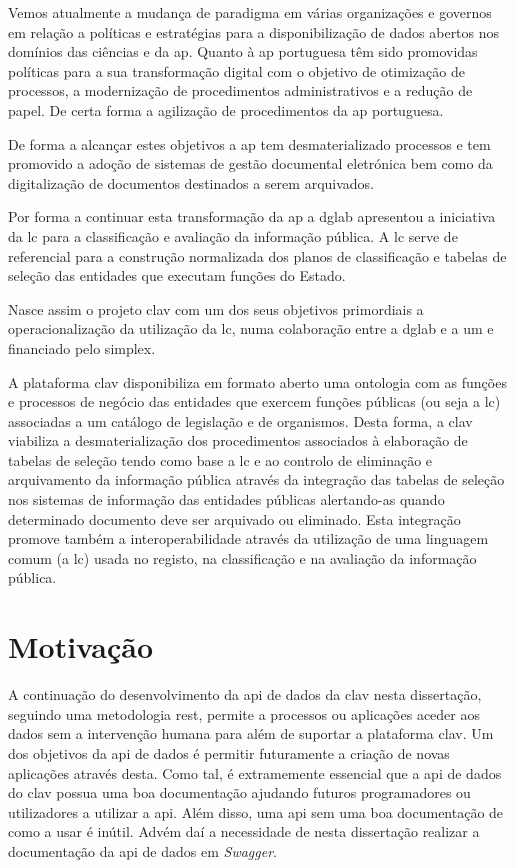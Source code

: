 Vemos atualmente a mudança de paradigma em várias organizações e governos em relação a políticas e estratégias para a disponibilização de dados abertos nos domínios das ciências e da \acrlong{ap}. Quanto à \acrlong{ap} portuguesa têm sido promovidas políticas para a sua transformação digital com o objetivo de otimização de processos, a modernização de procedimentos administrativos e a redução de papel. De certa forma a agilização de procedimentos da \acrlong{ap} portuguesa.~\cite{clav}

De forma a alcançar estes objetivos a \acrfull{ap} tem desmaterializado processos e tem promovido a adoção de sistemas de gestão documental eletrónica bem como da digitalização de documentos destinados a serem arquivados.~\cite{clav}

Por forma a continuar esta transformação da \acrshort{ap} a \acrfull{dglab} apresentou a iniciativa da \acrfull{lc} para a classificação e avaliação da informação pública. A \acrshort{lc} serve de referencial para a construção normalizada dos planos de classificação e tabelas de seleção das entidades que executam funções do Estado.~\cite{clav}

Nasce assim o projeto \acrfull{clav} com um dos seus objetivos primordiais a operacionalização da utilização da \acrshort{lc}, numa colaboração entre a \acrshort{dglab} e a \acrfull{um} e financiado pelo \Gls{simplex}.~\cite{clav}

A plataforma \acrshort{clav} disponibiliza em formato aberto uma \gls{ontologia} com as funções e processos de negócio das entidades que exercem funções públicas (ou seja a \acrshort{lc}) associadas a um catálogo de legislação e de organismos. Desta forma, a \acrshort{clav} viabiliza a desmaterialização dos procedimentos associados à elaboração de tabelas de seleção tendo como base a \acrshort{lc} e ao controlo de eliminação e arquivamento da informação pública através da integração das tabelas de seleção nos sistemas de informação das entidades públicas alertando-as quando determinado documento deve ser arquivado ou eliminado. Esta integração promove também a interoperabilidade através da utilização de uma linguagem comum (a \acrshort{lc}) usada no registo, na classificação e na avaliação da informação pública.~\cite{clav}

\section{Motivação}

A continuação do desenvolvimento da \acrshort{api} de dados da \acrshort{clav} nesta dissertação, seguindo uma metodologia \acrshort{rest}, permite a processos ou aplicações aceder aos dados sem a intervenção humana para além de suportar a plataforma \acrshort{clav}. Um dos objetivos da \acrshort{api} de dados é permitir futuramente a criação de novas aplicações através desta. Como tal, é extramemente essencial que a \acrshort{api} de dados do \acrshort{clav} possua uma boa documentação ajudando futuros programadores ou utilizadores a utilizar a \acrshort{api}. Além disso, uma \acrshort{api} sem uma boa documentação de como a usar é inútil. Advém daí a necessidade de nesta dissertação realizar a documentação da \acrshort{api} de dados em \textit{Swagger}.

